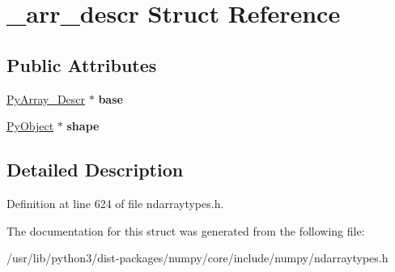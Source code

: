 \hypertarget{struct__arr__descr}{}\section{\+\_\+arr\+\_\+descr Struct Reference}
\label{struct__arr__descr}
\subsection*{Public Attributes}
\begin{DoxyCompactItemize}
\item 
\hyperlink{struct__PyArray__Descr}{Py\+Array\+\_\+\+Descr} $\ast$ {\bfseries base}\hypertarget{struct__arr__descr_a8642b2db596950dd65f2f3179bf3d582}{}\label{struct__arr__descr_a8642b2db596950dd65f2f3179bf3d582}

\item 
\hyperlink{struct__object}{Py\+Object} $\ast$ {\bfseries shape}\hypertarget{struct__arr__descr_ab0885bcbdb0717051977c86bfbd94bdc}{}\label{struct__arr__descr_ab0885bcbdb0717051977c86bfbd94bdc}

\end{DoxyCompactItemize}


\subsection{Detailed Description}


Definition at line 624 of file ndarraytypes.\+h.



The documentation for this struct was generated from the following file\+:\begin{DoxyCompactItemize}
\item 
/usr/lib/python3/dist-\/packages/numpy/core/include/numpy/ndarraytypes.\+h\end{DoxyCompactItemize}

